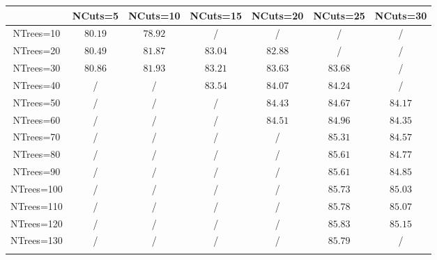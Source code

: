 \centering
\begin{tabular}{ccccccc} \toprule\toprule
 & NCuts=5 & NCuts=10 & NCuts=15 & NCuts=20 & NCuts=25 & NCuts=30\\\midrule
NTrees=10 & $80.19$ & $78.92$ &  / &  / &  / &  /\\
NTrees=20 & $80.49$ & $81.87$ & $83.04$ & $82.88$ &  / &  /\\
NTrees=30 & $80.86$ & $81.93$ & $83.21$ & $83.63$ & $83.68$ &  /\\
NTrees=40 &  / &  / & $83.54$ & $84.07$ & $84.24$ &  /\\
NTrees=50 &  / &  / &  / & $84.43$ & $84.67$ & $84.17$\\
NTrees=60 &  / &  / &  / & $84.51$ & $84.96$ & $84.35$\\
NTrees=70 &  / &  / &  / &  / & $85.31$ & $84.57$\\
NTrees=80 &  / &  / &  / &  / & $85.61$ & $84.77$\\
NTrees=90 &  / &  / &  / &  / & $85.61$ & $84.85$\\
NTrees=100 &  / &  / &  / &  / & $85.73$ & $85.03$\\
NTrees=110 &  / &  / &  / &  / & $85.78$ & $85.07$\\
NTrees=120 &  / &  / &  / &  / & $85.83$ & $85.15$\\
NTrees=130 &  / &  / &  / &  / & $85.79$ &  /\\
\bottomrule\bottomrule\\
\end{tabular}
